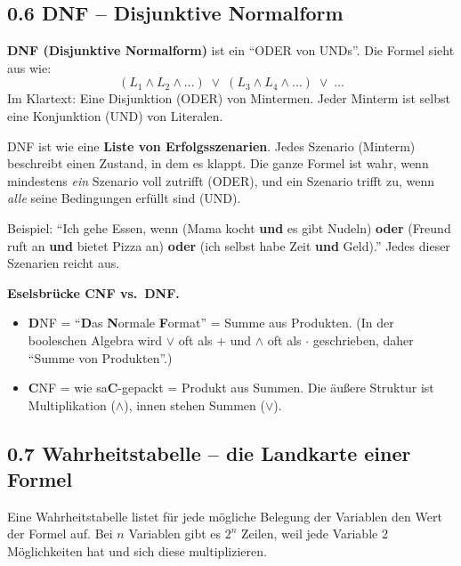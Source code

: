 \documentclass[a4paper,12pt]{article}
\begin{document}
\subsection*{0.6 DNF -- Disjunktive Normalform}

\begin{merkbox}
\textbf{DNF (Disjunktive Normalform)} ist ein "`ODER von UNDs"'. Die
Formel sieht aus wie:
\[
(L_1 \wedge L_2 \wedge \dots) \;\vee\; (L_3 \wedge L_4 \wedge \dots)
  \;\vee\; \dots
\]
Im Klartext: Eine Disjunktion (ODER) von Mintermen. Jeder Minterm ist
selbst eine Konjunktion (UND) von Literalen.
\end{merkbox}

\begin{analogie}
DNF ist wie eine \textbf{Liste von Erfolgsszenarien}. Jedes Szenario
(Minterm) beschreibt einen Zustand, in dem es klappt. Die ganze Formel
ist wahr, wenn mindestens \emph{ein} Szenario voll zutrifft (ODER),
und ein Szenario trifft zu, wenn \emph{alle} seine Bedingungen erf\"ullt
sind (UND).

\medskip
Beispiel: "`Ich gehe Essen, wenn (Mama kocht \textbf{und} es gibt
Nudeln) \textbf{oder} (Freund ruft an \textbf{und} bietet Pizza an)
\textbf{oder} (ich selbst habe Zeit \textbf{und} Geld)."' Jedes dieser
Szenarien reicht aus.
\end{analogie}

\begin{merkbox}
\textbf{Eselsbr\"ucke CNF vs.\ DNF.}
\begin{itemize}[nosep]
\item \textbf{D}NF = "`\textbf{D}as \textbf{N}ormale \textbf{F}ormat"'
      = Summe aus Produkten. (In der booleschen Algebra wird $\vee$
      oft als $+$ und $\wedge$ oft als $\cdot$ geschrieben, daher
      "`Summe von Produkten"'.)
\item \textbf{C}NF = wie sa\textbf{C}-gepackt = Produkt aus Summen.
      Die \"au{\ss}ere Struktur ist Multiplikation ($\wedge$), innen
      stehen Summen ($\vee$).
\end{itemize}
\end{merkbox}

\subsection*{0.7 Wahrheitstabelle -- die Landkarte einer Formel}

Eine Wahrheitstabelle listet f\"ur jede m\"ogliche Belegung der
Variablen den Wert der Formel auf. Bei $n$ Variablen gibt es $2^n$
Zeilen, weil jede Variable 2 M\"oglichkeiten hat und sich diese
multiplizieren.
\end{document}
